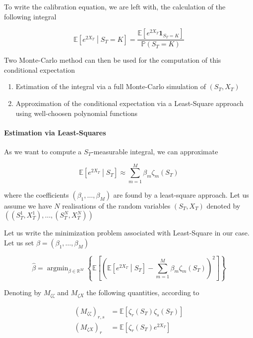\documentclass{article}
\DeclareMathOperator*{\argmin}{argmin}
\begin{document}
\noindent To write the calibration equation, we are left with, the calculation of the following integral

\begin{equation}
	\mathbb{E}\left[e^{2X_T}\middle| S_T=K\right] = \frac{\mathbb{E}\left[e^{2X_T} \textbf{1}_{S_T=K}\right]}{\mathbb{P}(S_T = K)}
\end{equation}

\noindent Two Monte-Carlo method can then be used for the computation of this conditional expectation

\begin{enumerate}
	\item Estimation of the integral via a full Monte-Carlo simulation of $(S_T,X_T)$
	\item Approximation of the conditional expectation via a Least-Square approach using well-choosen polynomial functions
\end{enumerate}

\paragraph{Estimation via Least-Squares}
As we want to compute a $S_T$-measurable integral, we can approximate

\begin{equation}
	\mathbb{E}\left[e^{2X_T}\middle| S_T \right] \approx \sum_{m=1}^{M} \beta_m \zeta_m\left(S_T\right)
\end{equation}

\noindent where the coefficients $(\beta_1, \dots, \beta_M)$ are found by a least-square approach. Let us assume we have $N$ realisations of the random variables $(S_T,X_T)$ denoted by $\left((S_T^1,X_T^1),\dots, (S_T^N,X_T^N)\right)$

\noindent Let us write the minimization problem associated with Least-Square in our case. Let us set $\beta = \left(\beta_1, \dots, \beta_M\right)$

\begin{equation}
	\hat{\beta} = \argmin_{\beta \in \mathbb{R}^M}
\left\{\mathbb{E}\left[\left(\mathbb{E}\left[e^{2X_T} \middle| S_T\right] - \sum_{m=1}^M \beta_m \zeta_m\left(S_T\right)\right)^2\right]\right\}
\end{equation}

\noindent Denoting by $M_{\zeta \zeta}$ and $M_{\zeta X}$ the following quantities, according to \cite{Humeau2013}

\begin{equation}
\begin{aligned}
	(M_{\zeta \zeta})_{r,s} &= \mathbb{E}\left[\zeta_r(S_T)\zeta_s(S_T)\right]\\
	(M_{\zeta X})_r &= \mathbb{E}\left[\zeta_r(S_T)e^{2X_T}\right]
\end{aligned}
\end{equation}
\end{document}

